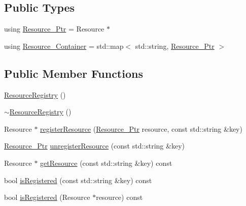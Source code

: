 \subsection*{Public Types}
\begin{DoxyCompactItemize}
\item 
using \mbox{\hyperlink{classec_1_1_resource_registry_a77cf5381229bff47d251603c783115fe}{Resource\+\_\+\+Ptr}} = Resource $\ast$
\item 
using \mbox{\hyperlink{classec_1_1_resource_registry_a0a2b5090a2bbc638a04a2c283812b956}{Resource\+\_\+\+Container}} = std\+::map$<$ std\+::string, \mbox{\hyperlink{classec_1_1_resource_registry_a77cf5381229bff47d251603c783115fe}{Resource\+\_\+\+Ptr}} $>$
\end{DoxyCompactItemize}
\subsection*{Public Member Functions}
\begin{DoxyCompactItemize}
\item 
\mbox{\hyperlink{classec_1_1_resource_registry_a9e0fdc82b578be6f0477f61116d5b361}{Resource\+Registry}} ()
\item 
\mbox{\hyperlink{classec_1_1_resource_registry_aa3153d0d76d45905833bafab53341731}{$\sim$\+Resource\+Registry}} ()
\item 
Resource $\ast$ \mbox{\hyperlink{classec_1_1_resource_registry_a91b0fa34611e9637ea2c0795a720b355}{register\+Resource}} (\mbox{\hyperlink{classec_1_1_resource_registry_a77cf5381229bff47d251603c783115fe}{Resource\+\_\+\+Ptr}} resource, const std\+::string \&key)
\item 
\mbox{\hyperlink{classec_1_1_resource_registry_a77cf5381229bff47d251603c783115fe}{Resource\+\_\+\+Ptr}} \mbox{\hyperlink{classec_1_1_resource_registry_ae1227f72ea04032d4e757ac4b5b0845a}{unregister\+Resource}} (const std\+::string \&key)
\item 
Resource $\ast$ \mbox{\hyperlink{classec_1_1_resource_registry_a2901efec7bcd829a007b041bd5ad2c1f}{get\+Resource}} (const std\+::string \&key) const
\item 
bool \mbox{\hyperlink{classec_1_1_resource_registry_a3279c60abcb023aad726eeac2a998d2c}{is\+Registered}} (const std\+::string \&key) const
\item 
bool \mbox{\hyperlink{classec_1_1_resource_registry_ae9c59e97bcfe2562c8f26d92855834bf}{is\+Registered}} (Resource $\ast$resource) const
\end{DoxyCompactItemize}


